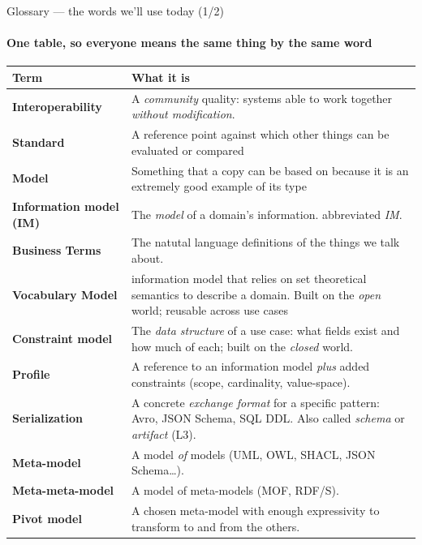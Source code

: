 \begin{frame}{Glossary — the words we'll use today (1/2)}
  \framesubtitle{One table, so everyone means the same thing by the same word}
  \scriptsize
  \setlength{\tabcolsep}{4pt}
  \renewcommand{\arraystretch}{1.15}
  \begin{center}
  \begin{tabular}{@{}p{3.3cm}p{11.5cm}@{}}
    \toprule
    \textbf{Term} & \textbf{What it is}\\
    \midrule
    \textbf{Interoperability} & A \emph{community} quality: systems able to work together \emph{without modification}.\\
    \textbf{Standard} & A reference point against which other things can be evaluated or compared\\
    \textbf{Model} & Something that a copy can be based on because it is an extremely good example of its type \\
    \textbf{Information model (IM)} & The \emph{model} of a domain's information. abbreviated \emph{IM}.\\
    \textbf{Business Terms} & The natutal language definitions of the things we talk about.\\
    \textbf{Vocabulary Model} & information model that relies on set theoretical semantics to describe a domain. Built on the \emph{open} world; reusable across use cases\\
    \textbf{Constraint model} & The \emph{data structure} of a use case: what fields exist and how much of each; built on the \emph{closed} world.\\
    \textbf{Profile} & A reference to an information model \emph{plus} added constraints (scope, cardinality, value-space).\\
    \textbf{Serialization} & A concrete \emph{exchange format} for a specific pattern: Avro, JSON Schema, SQL DDL. Also called \emph{schema} or \emph{artifact} (L3).\\
    \textbf{Meta-model} & A model \emph{of} models (UML, OWL, SHACL, JSON Schema\ldots).\\
    \textbf{Meta-meta-model} & A model of meta-models (MOF, RDF/S).\\
    \textbf{Pivot model} & A chosen meta-model with enough expressivity to transform to and from the others.\\
    \bottomrule
  \end{tabular}
  \end{center}
\end{frame}

